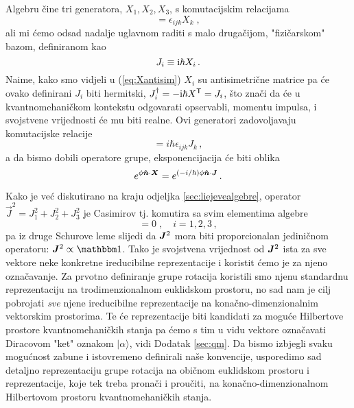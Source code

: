Algebru čine tri generatora, $X_1, X_2, X_3$, s komutacijskim relacijama
\begin{equation}
          [X_i, X_j] = \epsilon_{ijk} X_k \;,
\end{equation}
ali mi ćemo odsad nadalje uglavnom raditi s malo drugačijom, "fizičarskom" bazom, definiranom
kao
\begin{equation}
 J_i \equiv \textrm{i} \hbar X_i \,.
    \label{eq:jfromX}
\end{equation}
Naime, kako smo vidjeli u (\ref{eq:Xantisim}) $X_i$ su antisimetrične
matrice pa će ovako definirani $J_i$ biti hermitski, $J_{i}^{\dagger}
= - \textrm{i} \hbar X^\mathsf{T} = J_i$, što znači da će u kvantnomehaničkom
kontekstu odgovarati opservabli, momentu impulsa, i svojstvene vrijednosti
će mu biti realne.
Ovi generatori zadovoljavaju komutacijske relacije
\begin{equation}
          [J_i, J_j] = i \hbar \epsilon_{ijk} J_k \,,
\label{eq:SU2algebra}
\end{equation}
a da bismo dobili operatore grupe, eksponencijacija će biti oblika
\begin{equation}
e^{\phi\unitn\cdot\vec{X}}=e^{(-i/\hbar)\phi\unitn\cdot \vec{J}} \,.
    \label{eq:expJ}
\end{equation}


Kako je već diskutirano na kraju odjeljka \ref{sec:liejevealgebre},
operator $\vec{J}^2 = J_{1}^2 + J_{2}^2 + J_{3}^2$ je Casimirov
tj. komutira sa svim elementima algebre
\begin{equation}
   [\jsq, J_{i}^2]=0\;, \quad i=1,2,3 \,,
\end{equation}
pa iz druge Schurove leme slijedi da $\jsq$
mora biti proporcionalan jediničnom operatoru: $\jsq \propto \Eins$.
Tako je svojstvena vrijednost od $\jsq$ ista za sve vektore neke konkretne 
ireducibilne reprezentacije i koristit ćemo je za njeno označavanje.
Za prvotno definiranje grupe rotacija koristili smo njenu standardnu reprezentaciju
na trodimenzionalnom euklidskom prostoru, no sad nam je cilj pobrojati
\emph{sve} njene ireducibilne reprezentacije na konačno-dimenzionalnim
vektorskim prostorima. Te će reprezentacije biti kandidati za moguće
Hilbertove prostore kvantnomehaničkih stanja pa ćemo s tim u vidu vektore
označavati Diracovom "ket" oznakom $|\alpha\rangle$, vidi Dodatak \ref{sec:qm}.
Da bismo izbjegli svaku mogućnost zabune i istovremeno definirali
naše konvencije, usporedimo sad detaljno reprezentaciju grupe rotacija
na običnom euklidskom prostoru i reprezentacije, koje tek treba
pronači i proučiti, na konačno-dimenzionalnom Hilbertovom prostoru kvantnomehaničkih stanja.

